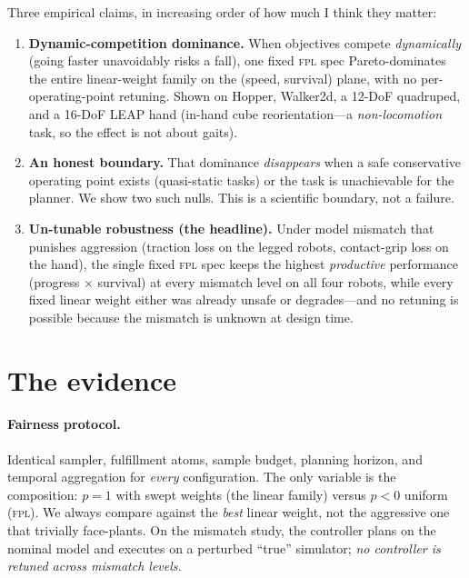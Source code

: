 \documentclass[11pt]{article}
\newcommand{\fpl}{\textsc{fpl}}
\newcommand{\claim}[1]{\textbf{\textcolor{blue!60!black}{#1}}}
\begin{document}
\medskip
\noindent Three empirical claims, in increasing order of how much I think they matter:

\begin{enumerate}[leftmargin=1.4em,itemsep=2pt]
\item \claim{Dynamic-competition dominance.} When objectives compete \emph{dynamically}
      (going faster unavoidably risks a fall), one fixed \fpl{} spec Pareto-dominates the
      entire linear-weight family on the (speed, survival) plane, with no per-operating-point
      retuning. Shown on Hopper, Walker2d, a 12-DoF quadruped, and a 16-DoF LEAP hand
      (in-hand cube reorientation---a \emph{non-locomotion} task, so the effect is not about gaits).
\item \claim{An honest boundary.} That dominance \emph{disappears} when a safe conservative
      operating point exists (quasi-static tasks) or the task is unachievable for the
      planner. We show two such nulls. This is a scientific boundary, not a failure.
\item \claim{Un-tunable robustness (the headline).} Under model mismatch that punishes
      aggression (traction loss on the legged robots, contact-grip loss on the hand), the
      single fixed \fpl{} spec keeps the highest \emph{productive} performance
      (progress $\times$ survival) at every mismatch level on all four robots, while every fixed
      linear weight either was already unsafe or degrades---and no retuning is possible because
      the mismatch is unknown at design time.
\end{enumerate}

\section{The evidence}

\paragraph{Fairness protocol.} Identical sampler, fulfillment atoms, sample budget, planning
horizon, and temporal aggregation for \emph{every} configuration. The only variable is the
composition: $p{=}1$ with swept weights (the linear family) versus $p{<}0$ uniform (\fpl).
We always compare against the \emph{best} linear weight, not the aggressive one that trivially
face-plants. On the mismatch study, the controller plans on the nominal model and executes on
a perturbed ``true'' simulator; \emph{no controller is retuned across mismatch levels.}
\end{document}
